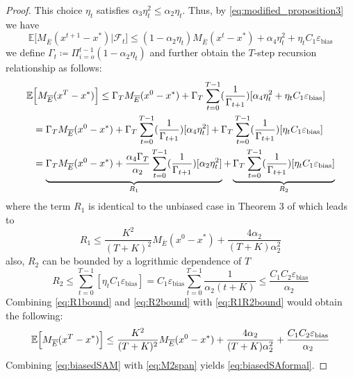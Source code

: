 \begin{proof}
    This choice $\eta_t$ satisfies $\alpha_3 \eta_t^2 \leq \alpha_2\eta_t$. Thus, by \eqref{eq:modified_proposition3} we have
    \begin{equation}
        \mathbb{E}\bigl[M_{\overline{E}}(x^{t+1} - x^*) | \mathcal{F}_t\Bigr] \leq (1-\alpha_2 \eta_t )  M_{\overline{E}}(x^{t} - x^*) + \alpha_4 \eta_t^2 + \eta_t C_1 \varepsilon_{\text{bias}}
    \end{equation}
    we define $\Gamma_t \coloneqq \Pi_{i=o}^{t-1}(1-\alpha_2\eta_t)$ and further obtain the $T$-step recursion relationship as follows:
    \begin{align}
        \mathbb{E}&\Bigl[M_{\overline{E}}(x^{T} - x^*)\Bigr]\leq \Gamma_T  M_{\overline{E}}(x^{0} - x^*) + \Gamma_T \sum_{t=0}^{T-1} (\frac{1}{\Gamma_{t+1}})[\alpha_4 \eta_t^2 + \eta_t C_1 \varepsilon_{\text{bias}}] \nonumber\\
        & = \Gamma_T  M_{\overline{E}}(x^{0} - x^*) + \Gamma_T \sum_{t=0}^{T-1} (\frac{1}{\Gamma_{t+1}})[\alpha_4 \eta_t^2] + \Gamma_T \sum_{t=0}^{T-1} (\frac{1}{\Gamma_{t+1}})[\eta_t C_1 \varepsilon_{\text{bias}}]\nonumber\\
        & = \underbrace{\Gamma_T  M_{\overline{E}}(x^{0} - x^*) + \frac{\alpha_4\Gamma_T}{\alpha_2} \sum_{t=0}^{T-1} (\frac{1}{\Gamma_{t+1}})[\alpha_2 \eta_t^2]}_{R_1} + \underbrace{\Gamma_T \sum_{t=0}^{T-1} (\frac{1}{\Gamma_{t+1}})[\eta_t C_1 \varepsilon_{\text{bias}}] }_{R_2} \label{eq:R1R2bound}
    \end{align}
    where the term $R_1$ is identical to the unbiased case in Theorem 3 of \citep{zhang2021finite} which leads to
    \begin{equation} \label{eq:R1bound}
        R_1 \leq \frac{K^2}{(T+K)^2}M_{\overline{E}}(x^{0} - x^*) + \frac{4\alpha_2}{(T+K)\alpha_2^2}
    \end{equation}
    also, $R_2$ can be bounded by a logrithmic dependence of $T$
    \begin{equation} \label{eq:R2bound}
        R_2 \leq  \sum_{t=0}^{T-1} [\eta_t C_1 \varepsilon_{\text{bias}}]  = C_1 \varepsilon_{\text{bias}} \sum_{t=0}^{T-1}\frac{1}{\alpha_2(t+K)} \leq \frac{C_1 C_2 \varepsilon_{\text{bias}} }{\alpha_2} 
    \end{equation}
    Combining \eqref{eq:R1bound} and \eqref{eq:R2bound} with \eqref{eq:R1R2bound} would obtain the following:
    \begin{equation} \label{eq:biasedSAM}
    \mathbb{E}\Bigl[M_{\overline{E}}(x^{T} - x^*)\Bigr]\leq  \frac{K^2}{(T+K)^2}M_{\overline{E}}(x^{0} - x^*) + \frac{4\alpha_2}{(T+K)\alpha_2^2}+ \frac{C_1 C_2 \varepsilon_{\text{bias}} }{\alpha_2} 
    \end{equation}
    Combining \eqref{eq:biasedSAM} with \eqref{eq:M2span} yields \eqref{eq:biasedSAformal}.
\end{proof}

